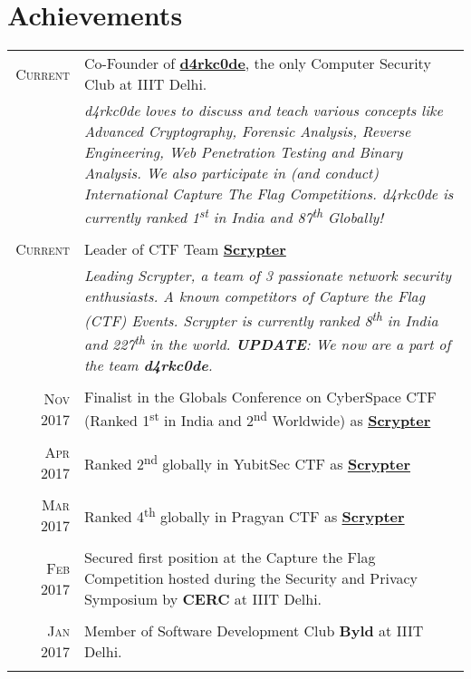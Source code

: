 \documentclass[a4paper,10pt]{article}
\begin{document}
\section{Achievements}
\begin{tabular}{r|p{13.7cm}}
\textsc{Current} & Co-Founder of \href{https://ctftime.org/team/15154}{\textbf{d4rkc0de}}, the only Computer Security Club at IIIT Delhi.  \\
& \emph{\small{d4rkc0de loves to discuss and teach various concepts like Advanced Cryptography, Forensic Analysis, Reverse Engineering, Web Penetration Testing and Binary Analysis. We also participate in (and conduct) International Capture The Flag Competitions. d4rkc0de is currently ranked 1\textsuperscript{st} in India and 87\textsuperscript{th} Globally!}}\\\multicolumn{2}{c}{}\\
\textsc{Current}& Leader of CTF Team \href{https://ctftime.org/team/31353}{\textbf{Scrypter}} \\
& \emph{\small{Leading Scrypter, a team of 3 passionate network security enthusiasts. A known competitors of Capture the Flag (CTF) Events. Scrypter is currently ranked 8\textsuperscript{th} in India and 227\textsuperscript{th} in the world. \textbf{UPDATE}: We now are a part of the team \textbf{d4rkc0de}.}}\\\multicolumn{2}{c}{}\\
 \textsc{Nov} 2017 & Finalist in the Globals Conference on CyberSpace CTF (Ranked 1\textsuperscript{st} in India and 2\textsuperscript{nd} Worldwide) as \href{https://ctftime.org/team/31353}{\textbf{Scrypter}}\\\multicolumn{2}{c}{}\\
\textsc{Apr} 2017 & Ranked 2\textsuperscript{nd} globally in YubitSec CTF as \href{https://ctftime.org/team/31353}{\textbf{Scrypter}}\\\multicolumn{2}{c}{}\\
\textsc{Mar} 2017 & Ranked 4\textsuperscript{th} globally in Pragyan CTF as \href{https://ctftime.org/team/31353}{\textbf{Scrypter}}\\\multicolumn{2}{c}{}\\
\textsc{Feb} 2017 & Secured first position at the Capture the Flag Competition hosted during the Security and Privacy Symposium by \textbf{CERC} at IIIT Delhi.\\\multicolumn{2}{c}{}\\
\textsc{Jan} 2017 & Member of Software Development Club \textbf{Byld} at IIIT Delhi.  \\\multicolumn{2}{c}{}\\

\end{tabular}
\end{document}
